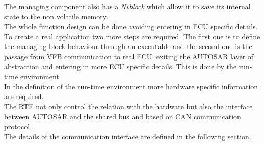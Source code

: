 \documentclass[../main.tex]{subfiles}
\begin{document}
The managing component also has a \textit{Nvblock} which allow it to save its internal state to the non volatile memory. \\
The whole function design can be done avoiding entering in \gls{ECU} specific details. To create a real application two more steps are required. The first one is to define the managing block behaviour through an executable and the second one is the passage from \gls{VFB} communication to real \gls{ECU}, exiting the \gls{AUTOSAR} layer of abstraction and entering in more \gls{ECU} specific details. This is done by the run-time environment.\\
In the definition of the run-time environment more hardware specific information are required.\\ The \gls{RTE} not only control the relation with the hardware but also the interface between \gls{AUTOSAR} and the shared \gls{bus} and based on \gls{CAN} communication protocol.\\
The details of the communication interface are defined in the following section.
\end{document}
